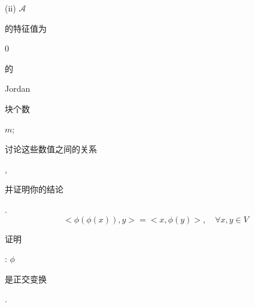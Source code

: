 \documentclass[10pt]{article}
\begin{document}
(ii) $\mathscr{A}$ \begin{CJK}{UTF8}{mj}的特征值为\end{CJK} 0 \begin{CJK}{UTF8}{mj}的\end{CJK} Jordan \begin{CJK}{UTF8}{mj}块个数\end{CJK} $m$;

\begin{CJK}{UTF8}{mj}讨论这些数值之间的关系\end{CJK}, \begin{CJK}{UTF8}{mj}并证明你的结论\end{CJK}.
$$
<\phi(\phi(x)), y>=<x, \phi(y)>, \quad \forall x, y \in V
$$
\begin{CJK}{UTF8}{mj}证明\end{CJK}: $\phi$ \begin{CJK}{UTF8}{mj}是正交变换\end{CJK}.
\end{document}
